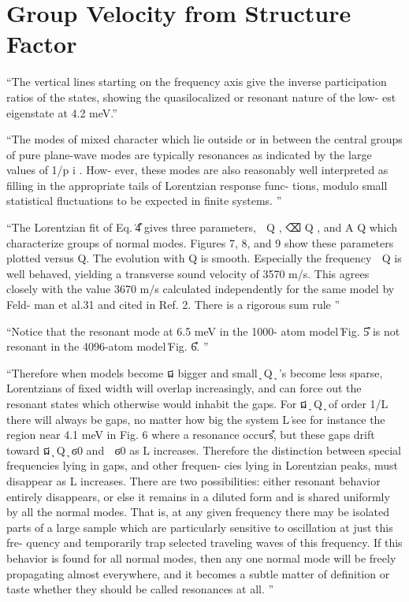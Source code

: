 \documentclass[aps,prb,preprint,superscriptaddress,amsmath,amssymb,floatfix]{revtex4}
\begin{document}
\clearpage
\section{\label{S:Introduction}Group Velocity from Structure Factor}

``The vertical lines
starting on the frequency axis give the inverse participation ratios of
the states, showing the quasilocalized or resonant nature of the low-
est eigenstate at 4.2 meV.''

``The
modes of mixed character which lie outside or in between
the central groups of pure plane-wave modes are typically
resonances as indicated by the large values of 1/p i .
How-
ever, these modes are also reasonably well interpreted as
filling in the appropriate tails of Lorentzian response func-
tions, modulo small statistical fluctuations to be expected in
finite systems.
''

``The Lorentzian fit of Eq. ͑4͒ gives three parameters,
␻ Q , ⌫ Q , and A Q which characterize groups of normal
modes. Figures 7, 8, and 9 show these parameters plotted
versus Q. The evolution with Q is smooth. Especially the
frequency ␻ Q is well behaved, yielding a transverse sound
velocity of 3570 m/s. This agrees closely with the value 3670
m/s calculated independently for the same model by Feld-
man et al.31 and cited in Ref. 2. There is a rigorous sum rule
''

``Notice that the resonant mode at 6.5 meV in the 1000-
atom model ͑Fig. 5͒ is not resonant in the 4096-atom model
͑Fig. 6͒. 
''

``Therefore when models become
ជ
bigger and small ͉ Q ͉ ’s become less sparse, Lorentzians of
fixed width will overlap increasingly, and can force out the
resonant states which otherwise would inhabit the gaps. For
ជ
͉ Q ͉ of order 1/L there will always be gaps, no matter how
big the system L ͑see for instance the region near 4.1 meV in
Fig. 6 where a resonance occurs͒, but these gaps drift toward
ជ
͉ Q ͉ ϭ0 and ␻ ϭ0 as L increases. Therefore the distinction
between special frequencies lying in gaps, and other frequen-
cies lying in Lorentzian peaks, must disappear as L increases.
There are two possibilities: either resonant behavior entirely
disappears, or else it remains in a diluted form and is shared
uniformly by all the normal modes. That is, at any given
frequency there may be isolated parts of a large sample
which are particularly sensitive to oscillation at just this fre-
quency and temporarily trap selected traveling waves of this
frequency. If this behavior is found for all normal modes,
then any one normal mode will be freely propagating almost
everywhere, and it becomes a subtle matter of definition or
taste whether they should be called resonances at all.
''
\end{document}
